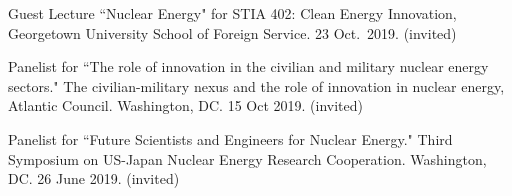 \begin{bibsection}
\item Guest Lecture ``Nuclear Energy" for STIA 402: Clean Energy Innovation, Georgetown University School of Foreign Service. 23 Oct.\ 2019. (invited)

\item Panelist for ``The role of innovation in the civilian and
military nuclear energy sectors." The civilian-military nexus and the role of
innovation in nuclear energy, Atlantic Council. Washington, DC. 15 Oct 2019.
(invited)






\item Panelist for ``Future Scientists and Engineers for Nuclear Energy." Third Symposium on US-Japan Nuclear Energy Research Cooperation. Washington, DC. 26 June 2019. (invited)






\end{bibsection}
